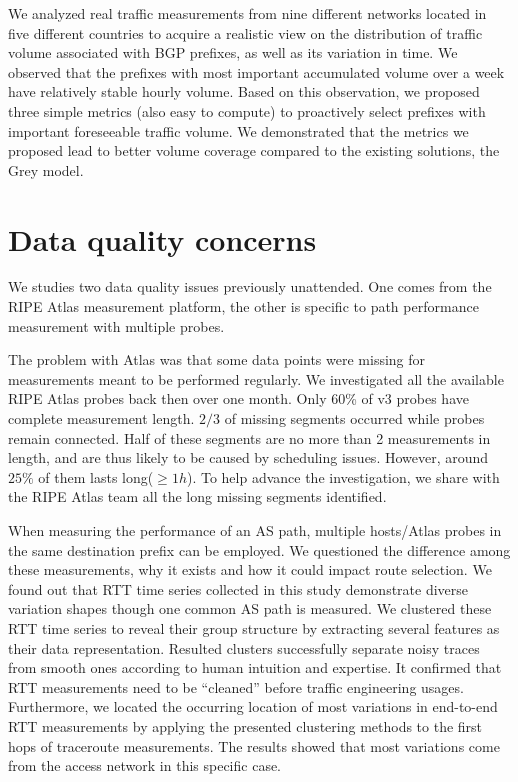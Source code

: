 We analyzed real traffic measurements from nine different networks located in five different countries to acquire a realistic view on the distribution of traffic volume associated with BGP prefixes, as well as its variation in time.   
We observed that the prefixes with most important accumulated volume over a week have relatively stable hourly volume. 
Based on this observation, we proposed three simple 
metrics (also easy to compute) to proactively select prefixes with important foreseeable traffic volume.
We demonstrated that the metrics we proposed lead to better volume coverage compared to the existing solutions, the Grey model.

\section{Data quality concerns}
We studies two data quality issues previously unattended. One comes from the RIPE Atlas measurement platform, the other is specific to path performance measurement with multiple probes.

The problem with Atlas was that some data points were missing for measurements meant to be performed regularly.
We investigated all the available RIPE Atlas probes back then over one month. Only 60\% of v3 probes have complete measurement length. 
$2/3$ of missing segments occurred while probes remain connected. 
Half of these segments are no more than 2 measurements in length, and are thus likely to be caused by scheduling issues. However, around $25\%$ of them lasts long($\geq 1h$). 
To help advance the investigation, we share with the RIPE Atlas team all the long missing segments identified.

When measuring the performance of an AS path, multiple hosts/Atlas probes in the same destination prefix can be employed. We questioned the difference among these measurements, why it exists and how it could impact route selection.
We found out that RTT time series collected in this study demonstrate diverse variation shapes though one common AS path is measured.
We clustered these RTT time series to reveal their group structure by extracting several features as their data representation. 
Resulted clusters successfully separate noisy traces from smooth ones according to human intuition and expertise.
It confirmed that RTT measurements need to be ``cleaned'' before traffic engineering usages.
Furthermore, we located the occurring location of most variations in end-to-end RTT measurements by applying the presented clustering methods to the first hops of traceroute measurements.
The results showed that most variations come from the access network in this specific case.

